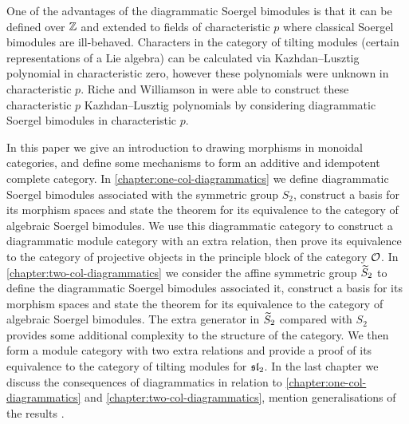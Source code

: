 One of the advantages of the diagrammatic Soergel bimodules is that it can be defined over $\mathbb{Z}$ and extended to fields of characteristic $p$ where classical Soergel bimodules are ill-behaved. Characters in the category of tilting modules (certain representations of a Lie algebra) can be calculated via Kazhdan--Lusztig polynomial in characteristic zero, however these polynomials were unknown in characteristic $p$. Riche and Williamson in \cite{riche-williamson-tilt-modules-p-canon-basis} were able to construct these characteristic $p$ Kazhdan--Lusztig polynomials by considering diagrammatic Soergel bimodules in characteristic $p$.





In this paper we give an introduction to drawing morphisms in monoidal categories,  and define some mechanisms to form an additive and idempotent complete category. In \autoref{chapter:one-col-diagrammatics} we define diagrammatic Soergel bimodules associated with the symmetric group $S_2$, construct a basis for its morphism spaces and state the theorem for its equivalence to the category of algebraic Soergel bimodules. We use this diagrammatic category to construct a diagrammatic module category with an extra relation, then prove its equivalence to the category of projective objects in the principle block of the category $\mathcal{O}$. In \autoref{chapter:two-col-diagrammatics} we consider the affine symmetric group $\widetilde{S}_2$ to define the diagrammatic Soergel bimodules associated it, construct a basis for its morphism spaces and state the theorem for its equivalence to the category of algebraic Soergel bimodules. The extra generator in $\widetilde{S}_2$ compared with $S_2$ provides some additional complexity to the structure of the category. We then form a module category with two extra relations and provide a proof of its equivalence to the category of tilting modules for $\operatorname{\mathfrak{sl}}_2$. In the last chapter we discuss the consequences of diagrammatics in relation to \autoref{chapter:one-col-diagrammatics} and \autoref{chapter:two-col-diagrammatics}, mention generalisations of the results .

